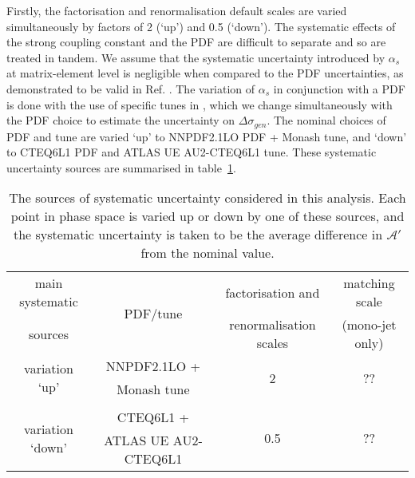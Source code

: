 %
%
Firstly, the factorisation and renormalisation default scales are varied simultaneously by factors of 2 (`up') and 0.5 (`down'). The systematic effects of the strong coupling constant and the PDF are difficult to separate and so are treated in tandem. We assume that the systematic uncertainty introduced by $\alpha_{s}$ at matrix-element level is negligible when compared to the PDF uncertainties, as demonstrated to be valid in Ref. \cite{CERN-THESIS-2015-038}. The variation of $\alpha_{s}$ in conjunction with a PDF is done with the use of specific tunes in \PYTHIA, which we change simultaneously with the PDF choice to estimate the uncertainty on $\Delta \sigma_{gen}$. The nominal choices of PDF and tune are varied `up' to NNPDF2.1LO PDF + Monash tune, and `down' to CTEQ6L1 PDF and ATLAS UE AU2-CTEQ6L1 tune.  These systematic uncertainty sources are summarised in table~\ref{tab:syst_unc}.

\begin{table}
\centering
\begin{tabular}{c|c|c|c}
\hline
\hline
main systematic & \multirow{2}{*}{PDF/tune} & factorisation and & matching scale \T \\
sources & & renormalisation scales & (mono-jet only) \B \\
\hline
\multirow{2}{*}{variation `up'} & NNPDF2.1LO + & \multirow{2}{*}{2} & \multirow{2}{*}{??} \T \\
& Monash tune & & \B \\
& & & \\
\multirow{2}{*}{variation `down'} & CTEQ6L1 + & \multirow{2}{*}{0.5} & \multirow{2}{*}{??} \T \\
& ATLAS UE AU2-CTEQ6L1 & & \B \\
\hline
\hline
\end{tabular}
\caption{The sources of systematic uncertainty considered in this analysis. Each point in phase space is varied up or down by one of these sources, and the systematic uncertainty is taken to be the average difference in $\mathcal{A}'$ from the nominal value. }
\label{tab:syst_unc}
\end{table}

